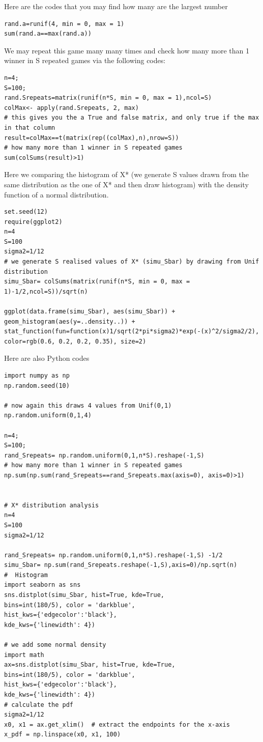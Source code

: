 \begin{exercise}
\begin{solution}
Here are the codes that you may find how many are the largest number
\begin{verbatim}
rand.a=runif(4, min = 0, max = 1)
sum(rand.a==max(rand.a))
\end{verbatim}
We may repeat this game many many times and check how many more than 1 winner in S repeated games via the following codes:
\begin{verbatim}
n=4;
S=100;
rand.Srepeats=matrix(runif(n*S, min = 0, max = 1),ncol=S)
colMax<- apply(rand.Srepeats, 2, max)
# this gives you the a True and false matrix, and only true if the max in that column
result=colMax==t(matrix(rep((colMax),n),nrow=S))  
# how many more than 1 winner in S repeated games 
sum(colSums(result)>1) 
\end{verbatim}

Here we comparing the histogram of X* 
(we generate S values drawn from the same distribution as the one of X* and then draw histogram)
with the density function of a normal distribution.
\begin{verbatim}
set.seed(12)
require(ggplot2)
n=4
S=100
sigma2=1/12
# we generate S realised values of X* (simu_Sbar) by drawing from Unif distribution 
simu_Sbar= colSums(matrix(runif(n*S, min = 0, max = 1)-1/2,ncol=S))/sqrt(n)  

ggplot(data.frame(simu_Sbar), aes(simu_Sbar)) + 
geom_histogram(aes(y=..density..)) +
stat_function(fun=function(x)1/sqrt(2*pi*sigma2)*exp(-(x)^2/sigma2/2),
color=rgb(0.6, 0.2, 0.2, 0.35), size=2)
\end{verbatim}

Here are also Python codes
\begin{verbatim} 
import numpy as np
np.random.seed(10)

# now again this draws 4 values from Unif(0,1)
np.random.uniform(0,1,4)

n=4;
S=100;
rand_Srepeats= np.random.uniform(0,1,n*S).reshape(-1,S)
# how many more than 1 winner in S repeated games
np.sum(np.sum(rand_Srepeats==rand_Srepeats.max(axis=0), axis=0)>1)


# X* distribution analysis
n=4
S=100
sigma2=1/12

rand_Srepeats= np.random.uniform(0,1,n*S).reshape(-1,S) -1/2
simu_Sbar= np.sum(rand_Srepeats.reshape(-1,S),axis=0)/np.sqrt(n)
#  Histogram
import seaborn as sns
sns.distplot(simu_Sbar, hist=True, kde=True, 
bins=int(180/5), color = 'darkblue', 
hist_kws={'edgecolor':'black'},
kde_kws={'linewidth': 4})

# we add some normal density                                                         
import math
ax=sns.distplot(simu_Sbar, hist=True, kde=True, 
bins=int(180/5), color = 'darkblue', 
hist_kws={'edgecolor':'black'},
kde_kws={'linewidth': 4})
# calculate the pdf
sigma2=1/12
x0, x1 = ax.get_xlim()  # extract the endpoints for the x-axis
x_pdf = np.linspace(x0, x1, 100)


\end{verbatim}
\end{solution}
\end{exercise}
